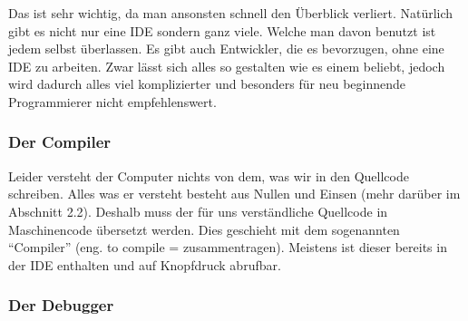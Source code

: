 Das ist sehr wichtig, da man ansonsten schnell den Überblick verliert. Natürlich gibt es nicht nur eine IDE sondern ganz viele. Welche man davon benutzt ist jedem selbst überlassen. Es gibt auch Entwickler, die es bevorzugen, ohne eine IDE zu arbeiten. Zwar lässt sich alles so gestalten wie es einem beliebt, jedoch wird dadurch alles viel komplizierter und besonders für neu beginnende Programmierer nicht empfehlenswert.







\subsubsection{Der Compiler}


Leider versteht der Computer nichts von dem, was wir in den Quellcode schreiben. Alles was er versteht besteht aus Nullen und Einsen (mehr darüber im Abschnitt 2.2). Deshalb muss der für uns verständliche Quellcode in Maschinencode übersetzt werden. Dies geschieht mit dem sogenannten "`Compiler"' (eng. to compile = zusammentragen). Meistens ist dieser bereits in der IDE enthalten und auf Knopfdruck abrufbar.







\subsubsection{Der Debugger}


